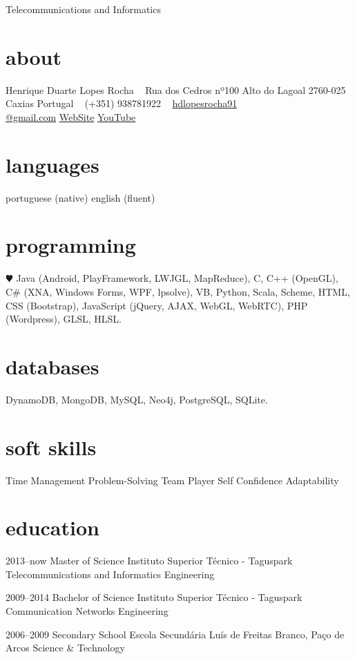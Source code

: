 \documentclass[]{friggeri-cv}
\begin{document}
       {Telecommunications and Informatics}


\begin{aside}
  \section{about}
    Henrique Duarte Lopes Rocha
    ~
    Rua dos Cedros nº100
    Alto do Lagoal
    2760-025 Caxias
    Portugal
    ~
    (+351) 938781922
    ~
    \href{mailto:hdlopesrocha91@gmail.com}{hdlopesrocha91\\@gmail.com}
    \href{http://web.ist.utl.pt/ist168621}{WebSite}
    \href{http://www.youtube.com/user/hdlopesrocha}{YouTube}
  \section{languages}
    portuguese (native)
    english (fluent)
  \section{programming}
    {\color{red} $\varheartsuit$} Java
	 (Android, PlayFramework, LWJGL, MapReduce), C, C++ (OpenGL), C\# (XNA, Windows Forms, WPF, lpsolve), VB, Python, Scala, Scheme, HTML, CSS (Bootstrap), JavaScript (jQuery, AJAX, WebGL, WebRTC), PHP (Wordpress), GLSL, HLSL.  
   \section{databases}
	DynamoDB, MongoDB, MySQL, Neo4j, PostgreSQL, SQLite.
   \section{soft skills}
	Time Management
	Problem-Solving
	Team Player
	Self Confidence
	Adaptability
\end{aside}

\section{education}

\begin{entrylist}
   \entry
    {2013–now}
    {Master of Science}
    {Instituto Superior Técnico - Taguspark}
    {Telecommunications and Informatics Engineering}
  
   \entry
    {2009–2014}
    {Bachelor of Science}
    {Instituto Superior Técnico - Taguspark}
    {Communication Networks Engineering}

  \entry
    {2006–2009}
    {Secondary School}
    {Escola Secundária Luís de Freitas Branco, Paço de Arcos}
    {Science \& Technology}

\end{entrylist}
\end{document}

